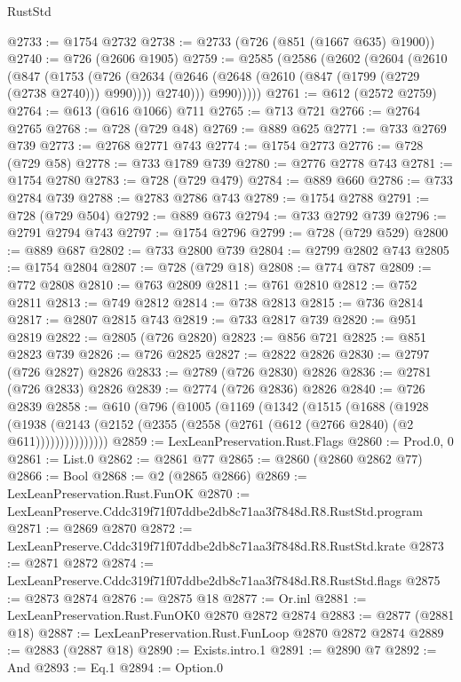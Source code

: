 \begin{lexlean}{RustStd}
\begin{coremodule}
@2733 := @1754 @2732
@2738 := @2733 (@726 (@851 (@1667 @635) @1900))
@2740 := @726 (@2606 @1905)
@2759 := @2585
    (@2586
      (@2602
        (@2604
          (@2610
            (@847
              (@1753
                (@726
                  (@2634 (@2646 (@2648 (@2610 (@847 (@1799 (@2729 (@2738 @2740))) @990)))) @2740)))
              @990)))))
@2761 := @612 (@2572 @2759)
@2764 := @613 (@616 @1066) @711
@2765 := @713 @721
@2766 := @2764 @2765
@2768 := @728 (@729 @48)
@2769 := @889 @625
@2771 := @733 @2769 @739
@2773 := @2768 @2771 @743
@2774 := @1754 @2773
@2776 := @728 (@729 @58)
@2778 := @733 @1789 @739
@2780 := @2776 @2778 @743
@2781 := @1754 @2780
@2783 := @728 (@729 @479)
@2784 := @889 @660
@2786 := @733 @2784 @739
@2788 := @2783 @2786 @743
@2789 := @1754 @2788
@2791 := @728 (@729 @504)
@2792 := @889 @673
@2794 := @733 @2792 @739
@2796 := @2791 @2794 @743
@2797 := @1754 @2796
@2799 := @728 (@729 @529)
@2800 := @889 @687
@2802 := @733 @2800 @739
@2804 := @2799 @2802 @743
@2805 := @1754 @2804
@2807 := @728 (@729 @18)
@2808 := @774 @787
@2809 := @772 @2808
@2810 := @763 @2809
@2811 := @761 @2810
@2812 := @752 @2811
@2813 := @749 @2812
@2814 := @738 @2813
@2815 := @736 @2814
@2817 := @2807 @2815 @743
@2819 := @733 @2817 @739
@2820 := @951 @2819
@2822 := @2805 (@726 @2820)
@2823 := @856 @721
@2825 := @851 @2823 @739
@2826 := @726 @2825
@2827 := @2822 @2826
@2830 := @2797 (@726 @2827) @2826
@2833 := @2789 (@726 @2830) @2826
@2836 := @2781 (@726 @2833) @2826
@2839 := @2774 (@726 @2836) @2826
@2840 := @726 @2839
@2858 := @610
    (@796
      (@1005
        (@1169
          (@1342
            (@1515
              (@1688
                (@1928
                  (@1938
                    (@2143 (@2152 (@2355 (@2558 (@2761 (@612 (@2766 @2840) (@2 @611)))))))))))))))
@2859 := LexLeanPreservation.Rust.Flags
@2860 := Prod.{0, 0}
@2861 := List.{0}
@2862 := @2861 @77
@2865 := @2860 (@2860 @2862 @77)
@2866 := Bool
@2868 := @2 (@2865 @2866)
@2869 := LexLeanPreservation.Rust.FunOK
@2870 := LexLeanPreserve.Cddc319f71f07ddbe2db8c71aa3f7848d.R8.RustStd.program
@2871 := @2869 @2870
@2872 := LexLeanPreserve.Cddc319f71f07ddbe2db8c71aa3f7848d.R8.RustStd.krate
@2873 := @2871 @2872
@2874 := LexLeanPreserve.Cddc319f71f07ddbe2db8c71aa3f7848d.R8.RustStd.flags
@2875 := @2873 @2874
@2876 := @2875 @18
@2877 := Or.inl
@2881 := LexLeanPreservation.Rust.FunOK0 @2870 @2872 @2874
@2883 := @2877 (@2881 @18)
@2887 := LexLeanPreservation.Rust.FunLoop @2870 @2872 @2874
@2889 := @2883 (@2887 @18)
@2890 := Exists.intro.{1}
@2891 := @2890 @7
@2892 := And
@2893 := Eq.{1}
@2894 := Option.{0}

\end{coremodule}
\end{lexlean}
